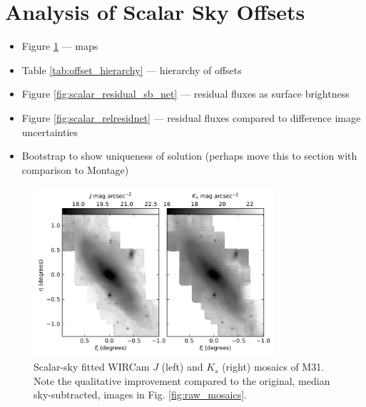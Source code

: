 \documentclass[iop]{emulateapj}
\begin{document}
\section{Analysis of Scalar Sky Offsets}
\label{sec:scalaranalysis}

\begin{itemize}
\item Figure \ref{fig:scalar_mosaics} --- maps
\item Table \ref{tab:offset_hierarchy} --- hierarchy of offsets
\item Figure \ref{fig:scalar_residual_sb_net} --- residual fluxes as surface brightness
\item Figure \ref{fig:scalar_relresidnet} --- residual fluxes compared to difference image uncertainties
\item Bootstrap to show uniqueness of solution (perhaps move this to section with comparison to Montage)
\end{itemize}

\begin{figure}[t]
	\centering
		\includegraphics[width=3.5in]{figs/scalar_mosaics}
	\caption{Scalar-sky fitted WIRCam $J$ (left) and $K_s$ (right) mosaics of M31. Note the qualitative improvement compared to the original, median sky-subtracted, images in Fig. \ref{fig:raw_mosaics}.}
	\label{fig:scalar_mosaics}
\end{figure}
\end{document}
